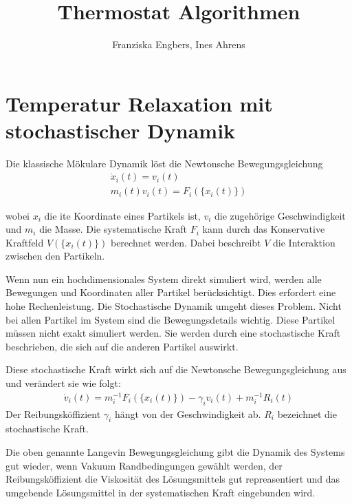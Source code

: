 \documentclass[]{article}
\title{Thermostat Algorithmen}
\author{Franziska Engbers, Ines Ahrens}
\begin{document}
\maketitle


\section{Temperatur Relaxation mit stochastischer Dynamik}

Die klassische Mökulare Dynamik löst die Newtonsche Bewegungsgleichung
\begin{align*}
	\dot{x}_i(t) = v_i(t) \\
	m_i(t) v_i(t) = F_i(\{ x_i(t)\}) 
\end{align*}

wobei $x_i$ die ite Koordinate eines Partikels ist, $v_i$ die zugehörige Geschwindigkeit und $m_i$ die Masse. Die systematische Kraft $F_i$ kann durch das Konservative Kraftfeld $V(\{x_i(t)\})$ berechnet werden. Dabei beschreibt $V$ die Interaktion zwischen den Partikeln.   

Wenn nun ein hochdimensionales System direkt simuliert wird, werden alle Bewegungen und Koordinaten aller Partikel berücksichtigt. Dies erfordert eine hohe Rechenleistung. 
Die Stochastische Dynamik umgeht dieses Problem. Nicht bei allen Partikel im System sind die Bewegungsdetails wichtig. Diese Partikel müssen nicht exakt simuliert werden. Sie werden durch eine stochastische Kraft beschrieben, die sich auf die anderen Partikel auswirkt. 

Diese stochastische Kraft wirkt sich auf die Newtonsche Bewegungsgleichung aus und verändert sie wie folgt:
\begin{align*}
	\dot{v}_i(t)  = m_i^{-1} F_i(\{x_i(t)\}) - \gamma_i v_i(t) + m_i^{-1} R_i(t)
\end{align*}
Der Reibungsköffizient $\gamma_i$ hängt von der Geschwindigkeit ab. $R_i$ bezeichnet die stochastische Kraft.

Die oben genannte Langevin Bewegungsgleichung gibt die Dynamik des Systems gut wieder, wenn Vakuum Randbedingungen gewählt werden, der Reibungsköffizient die Viskosität des Lösungsmittels gut repreasentiert und das umgebende Lösungsmittel in der systematischen Kraft eingebunden wird. 
\end{document}
